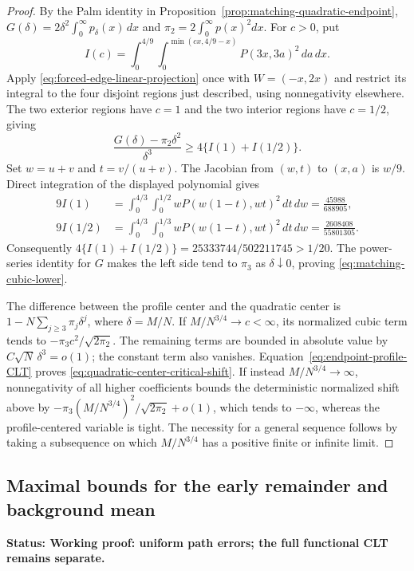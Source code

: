 \documentclass[11pt,letterpaper]{article}
\newcommand{\status}[1]{\textbf{Status: #1.}}
\begin{document}
\begin{proof}
By the Palm identity in
Proposition~\ref{prop:matching-quadratic-endpoint},
$G(\delta)=2\delta^2\int_0^\infty p_\delta(x)\,dx$ and
$\pi_2=2\int_0^\infty p(x)^2dx$.
For $c>0$, put
\[
 I(c)=\int_0^{4/9}\int_0^{\min(cx,4/9-x)}
                         P(3x,3a)^2\,da\,dx.
\]
Apply \eqref{eq:forced-edge-linear-projection} once with
$W=(-x,2x)$ and restrict its integral to the four disjoint
regions just described, using nonnegativity elsewhere.
The two exterior regions have $c=1$ and the two interior
regions have $c=1/2$, giving
\[
 \frac{G(\delta)-\pi_2\delta^2}{\delta^3}
                    \ge4\{I(1)+I(1/2)\}.
\]
Set $w=u+v$ and $t=v/(u+v)$.
The Jacobian from $(w,t)$ to $(x,a)$ is $w/9$.
Direct integration of the displayed polynomial gives
\[
 \begin{aligned}
 9I(1)&=\int_0^{4/3}\int_0^{1/2}
               wP(w(1-t),wt)^2\,dt\,dw=\frac{45988}{688905},\\
 9I(1/2)&=\int_0^{4/3}\int_0^{1/3}
               wP(w(1-t),wt)^2\,dt\,dw=\frac{2608408}{55801305}.
 \end{aligned}
\]
Consequently
$4\{I(1)+I(1/2)\}=25333744/502211745>1/20$.
The power-series identity for $G$ makes the left side tend to
$\pi_3$ as $\delta\downarrow0$, proving
\eqref{eq:matching-cubic-lower}.

The difference between the profile center and the quadratic
center is
$1-N\sum_{j\ge3}\pi_j\delta^j$, where $\delta=M/N$.
If $M/N^{3/4}\to c<\infty$, its normalized cubic term tends to
$-\pi_3c^2/\sqrt{2\pi_2}$.
The remaining terms are bounded in absolute value by
$C\sqrt N\,\delta^3=o(1)$; the constant term also vanishes.
Equation~\eqref{eq:endpoint-profile-CLT} proves
\eqref{eq:quadratic-center-critical-shift}.
If instead $M/N^{3/4}\to\infty$, nonnegativity of all higher
coefficients bounds the deterministic normalized shift above by
$-\pi_3(M/N^{3/4})^2/\sqrt{2\pi_2}+o(1)$, which tends to
$-\infty$, whereas the profile-centered variable is tight.
The necessity for a general sequence follows by taking a
subsequence on which $M/N^{3/4}$ has a positive finite or
infinite limit.
\end{proof}

\subsection{Maximal bounds for the early remainder and background mean}
\label{sec:history-process-remainders}

\status{Working proof: uniform path errors; the full functional CLT remains separate}
\end{document}
